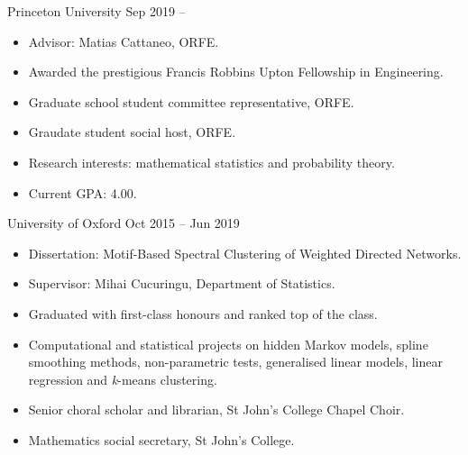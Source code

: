 \documentclass[
  date,
  number,
]{wgu-cv}
\begin{document}
\maketitle





{Princeton University}
{Sep 2019 --}

\begin{itemize}
  \item Advisor: Matias Cattaneo, ORFE.
	\item Awarded the prestigious Francis Robbins Upton Fellowship in Engineering.
  \item Graduate school student committee representative, ORFE.
  \item Graudate student social host, ORFE.
  \item Research interests:
    mathematical statistics and probability theory.
  \item Current GPA: 4.00.
\end{itemize}


{University of Oxford}
{Oct 2015 -- Jun 2019}

\begin{itemize}
  \item Dissertation:
    Motif-Based Spectral Clustering of Weighted Directed Networks.
  \item Supervisor:
    Mihai Cucuringu,
    Department of Statistics.
  \item Graduated with first-class honours and ranked top of the class.
  \item Computational and statistical projects on
    hidden Markov models,
    spline smoothing methods,
    non-parametric tests,
    generalised linear models,
    linear regression
    and
    \textit{k}-means clustering.
	\item Senior choral scholar and librarian,
    St John's College Chapel Choir.
	\item Mathematics social secretary, St John's College.
\end{itemize}


\end{document}
